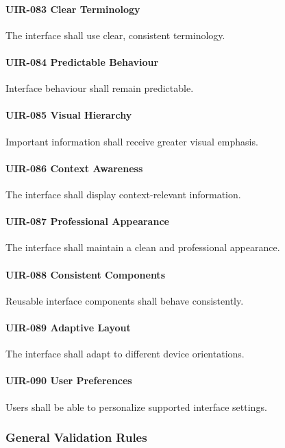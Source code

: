 \paragraph{UIR-083 Clear Terminology}
The interface shall use clear, consistent terminology.

\paragraph{UIR-084 Predictable Behaviour}
Interface behaviour shall remain predictable.

\paragraph{UIR-085 Visual Hierarchy}
Important information shall receive greater visual emphasis.

\paragraph{UIR-086 Context Awareness}
The interface shall display context-relevant information.

\paragraph{UIR-087 Professional Appearance}
The interface shall maintain a clean and professional appearance.

\paragraph{UIR-088 Consistent Components}
Reusable interface components shall behave consistently.

\paragraph{UIR-089 Adaptive Layout}
The interface shall adapt to different device orientations.

\paragraph{UIR-090 User Preferences}
Users shall be able to personalize supported interface settings.

\subsubsection*{General Validation Rules}

